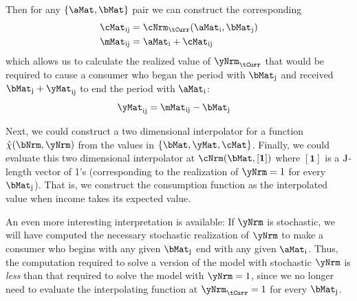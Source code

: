 \documentclass[./SolvingMicroDSOPs]{subfiles}
\begin{document}
{  Then for any $\{\aMat,\bMat\}$ pair we can construct the corresponding
  \begin{align}
    \cMat_{\aIdx\bIdx} & = \mathfrak{\cNrm}_{\tCurr}(\aMat_{\aIdx},\bMat_{\bIdx})
    \\ \mMat_{\aIdx\bIdx} & = \aMat_{\aIdx}+\cMat_{\aIdx\bIdx}                       
  \end{align}
  which allows us to calculate the realized value of $\yNrm_{\tCurr}$ that would be required to cause a consumer who began the period with $\bMat_{\bIdx}$ and received $\bMat_{\bIdx}+\yMat_{\aIdx\bIdx}$ to end the period with $\aMat_{\aIdx}$:
  \begin{align}
    \yMat_{\aIdx\bIdx} & = \mMat_{\aIdx\bIdx}-\bMat_{\bIdx}
  \end{align}

  Next, we could construct a two dimensional interpolator for a function $\hat{\chi}(\bNrm,\yNrm)$ from the values in $\{\bMat,\yMat,\cMat\}$.  Finally, we could evaluate this two dimensional interpolator at $\mathfrak{\cNrm}(\bMat,[\mathbf{1}])$ where $[\mathbf{1}]$ is a $\mathrm{J}$-length vector of 1's (corresponding to the realization of $\yNrm=1$ for every $\bMat_{\bIdx}$).  That is, we construct the consumption function as the interpolated value when income takes its expected value.

  An even more interesting interpretation is available:  If $\yNrm$ is stochastic, we will have computed the necessary stochastic realization of $\yNrm$ to make a consumer who begins with any given $\bMat_{\bIdx}$ end with any given $\aMat_{\aIdx}$.  Thus, the computation required to solve a version of the model with stochastic $\yNrm$ is \textit{less} than that required to solve the model with $\yNrm=1$, since we no longer need to evaluate the interpolating function at $\yNrm_{\tCurr}=1$ for every $\bMat_{\bIdx}$.
} %
\end{document}
